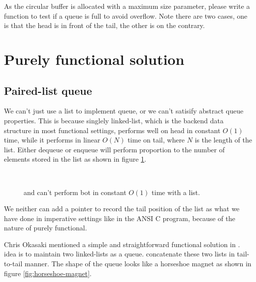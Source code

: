 \documentclass{article}
\begin{document}
\begin{Exercise}
As the circular buffer is allocated with a maximum size parameter, please
write a function to test if a queue is full to avoid overflow. Note
there are two cases, one is that the head is in front of the tail,
the other is on the contrary.
\end{Exercise}

\section{Purely functional solution}

\subsection{Paired-list queue}

We can't just use a list to implement queue, or we can't satisify abstract 
queue properties. This is because singlely linked-list, which
is the backend data structure in most functional settings, performs 
well on head in constant $O(1)$ time, while it performs in linear $O(N)$ 
time on tail, where $N$ is the length of the list. Either dequeue or enqueue
will perform proportion to the number of elements stored in the list
as shown in figure \ref{fig:linked-list-queue}.

\begin{figure}[htbp]
  \centering
   \\
  \caption{ and  can't perform bot in constant $O(1)$ time with a list.} \label{fig:linked-list-queue}
\end{figure}

We neither can add a pointer to record the tail position of the list
as what we have done in imperative settings like in the ANSI C program,
because of the nature of purely functional.

Chris Okasaki mentioned a simple and straightforward functional solution
in \cite{okasaki-book}. idea is to maintain two linked-lists as a queue. 
concatenate these two lists in tail-to-tail manner. The shape of the queue 
looks like a horseshoe magnet as shown in figure \ref{fig:horseshoe-magnet}.
\end{document}
